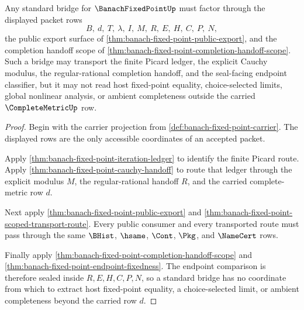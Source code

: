 \begin{theorem}
\label{thm:banach-fixed-point-bridge-packet-scope}
Any standard bridge for $\BanachFixedPointUp$ must factor through the displayed packet rows
$$
B,\ d,\ T,\ \lambda,\ I,\ M,\ R,\ E,\ H,\ C,\ P,\ N,
$$
the public export surface of \autoref{thm:banach-fixed-point-public-export}, and the completion handoff scope of \autoref{thm:banach-fixed-point-completion-handoff-scope}. Such a bridge may transport the finite Picard ledger, the explicit Cauchy modulus, the regular-rational completion handoff, and the seal-facing endpoint classifier, but it may not read host fixed-point equality, choice-selected limits, global nonlinear analysis, or ambient completeness outside the carried $\CompleteMetricUp$ row.
\end{theorem}
\begin{proof}
Begin with the carrier projection from \autoref{def:banach-fixed-point-carrier}. The displayed rows are the only accessible coordinates of an accepted packet.

Apply \autoref{thm:banach-fixed-point-iteration-ledger} to identify the finite Picard route. Apply \autoref{thm:banach-fixed-point-cauchy-handoff} to route that ledger through the explicit modulus $M$, the regular-rational handoff $R$, and the carried complete-metric row $d$.

Next apply \autoref{thm:banach-fixed-point-public-export} and \autoref{thm:banach-fixed-point-scoped-transport-route}. Every public consumer and every transported route must pass through the same $\BHist$, $\hsame$, $\Cont$, $\Pkg$, and $\NameCert$ rows.

Finally apply \autoref{thm:banach-fixed-point-completion-handoff-scope} and \autoref{thm:banach-fixed-point-endpoint-fixedness}. The endpoint comparison is therefore sealed inside $R,E,H,C,P,N$, so a standard bridge has no coordinate from which to extract host fixed-point equality, a choice-selected limit, or ambient completeness beyond the carried row $d$.
\end{proof}

